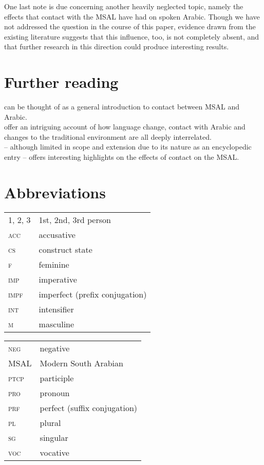 \documentclass[output=paper]{langsci/langscibook}
\begin{document}
One last note is due concerning another heavily neglected topic, namely the effects that contact with the MSAL have had on spoken Arabic. Though we have not addressed the question in the course of this paper, evidence drawn from the existing literature \citet{Simeone-Senelle2002} suggests that this influence, too, is not completely absent, and that further research in this direction could produce interesting results. 

\section*{Further reading}

 \citet{Morris2017} can be thought of as a general introduction to contact between MSAL and Arabic. \\
 \citet{WatsonAl-Mahri2017} offer an intriguing account of how language change, contact with Arabic and changes to the traditional environment are all deeply interrelated. \\ \citet{Lonnet2011} – although limited in scope and extension due to its nature as an encyclopedic entry – offers interesting highlights on the effects of contact on the MSAL.
 
 
\section*{Abbreviations}

\begin{tabularx}{.5\textwidth}{@{}lQ@{}}
\textsc{1, 2, 3} & 1st, 2nd, 3rd person \\
\textsc{acc} & accusative \\
\textsc{cs} & construct state \\
\textsc{f} & feminine \\
\textsc{imp} & imperative \\
\textsc{impf} & imperfect (prefix conjugation) \\
\textsc{int} & intensifier \\
\textsc{m} & masculine \\
\end{tabularx}%
\begin{tabularx}{.5\textwidth}{@{}lQ@{}}
\textsc{neg} & negative \\
MSAL & Modern South Arabian \\
\textsc{ptcp} & participle \\
\textsc{pro} & pronoun \\
\textsc{prf} & perfect (suffix conjugation) \\
\textsc{pl} & plural \\
\textsc{sg} & singular \\
\textsc{voc} & vocative \\
\end{tabularx}%


\sloppy
\printbibliography[heading=subbibliography,notkeyword=this]
\end{document}
